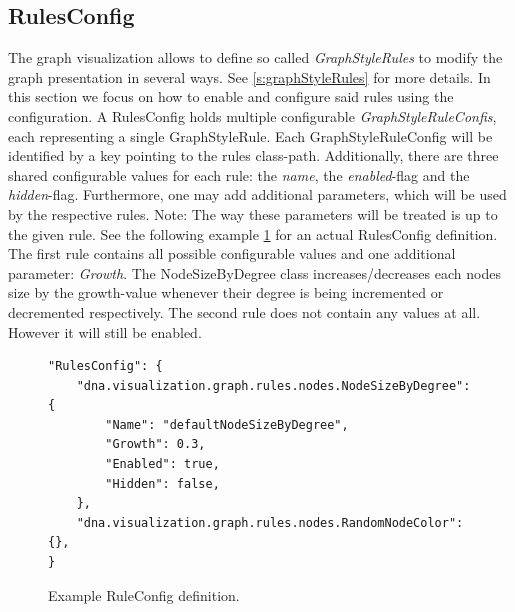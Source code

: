 \subsection{RulesConfig}
\label{ss:rulesConfig}
The graph visualization allows to define so called \emph{GraphStyleRules} to modify the graph presentation in several ways. See \ref{s:graphStyleRules} for more details. In this section we focus on how to enable and configure said rules using the configuration. A RulesConfig holds multiple configurable \emph{GraphStyleRuleConfis}, each representing a single GraphStyleRule. Each GraphStyleRuleConfig will be identified by a key pointing to the rules class-path. Additionally, there are three shared configurable values for each rule: the \emph{name}, the \emph{enabled}-flag and the \emph{hidden}-flag. Furthermore, one may add additional parameters, which will be used by the respective rules. Note: The way these parameters will be treated is up to the given rule. See the following example \ref{config:exampleRuleConfig} for an actual RulesConfig definition. The first rule contains all possible configurable values and one additional parameter: \emph{Growth}. The NodeSizeByDegree class increases/decreases each nodes size by the growth-value whenever their degree is being incremented or decremented respectively. The second rule does not contain any values at all. However it will still be enabled.

\begin{figure} [h]
\begin{lstlisting}
"RulesConfig": {
	"dna.visualization.graph.rules.nodes.NodeSizeByDegree": {
		"Name": "defaultNodeSizeByDegree",
		"Growth": 0.3,
		"Enabled": true,
		"Hidden": false,
	},
	"dna.visualization.graph.rules.nodes.RandomNodeColor": {},
}
\end{lstlisting}
\caption{Example RuleConfig definition.}
\label{config:exampleRuleConfig}
\end{figure}

